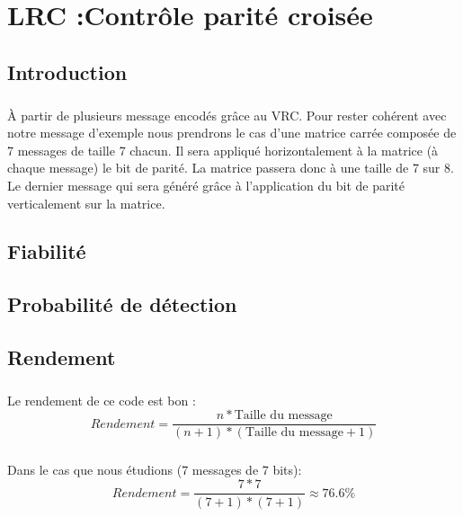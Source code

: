 
\chapter{LRC :Contrôle parité croisée}

    \section{Introduction}

        \paragraph{}
À partir de plusieurs message encodés grâce au VRC.
Pour rester cohérent avec notre message d'exemple nous prendrons le cas d'une matrice carrée composée de 7 messages de taille 7 chacun.
Il sera appliqué horizontalement à la matrice (à chaque message) le bit de parité.
La matrice passera donc à une taille de 7 sur 8.
Le dernier message qui sera généré grâce à l'application du bit de parité verticalement sur la matrice.


    \section{Fiabilité}

        \paragraph{}


    \section{Probabilité de détection}

        \paragraph{}


    \section{Rendement}

        \paragraph{}
Le rendement de ce code est bon :
\[  Rendement = \frac{n*\text{Taille du message}}{(n+1)*(\text{Taille du message}+1)} \]
        \paragraph{}
Dans le cas que nous étudions (7 messages de 7 bits):
\[  Rendement = \frac{7*7}{(7+1)*(7+1)} \approx 76.6\% \]

